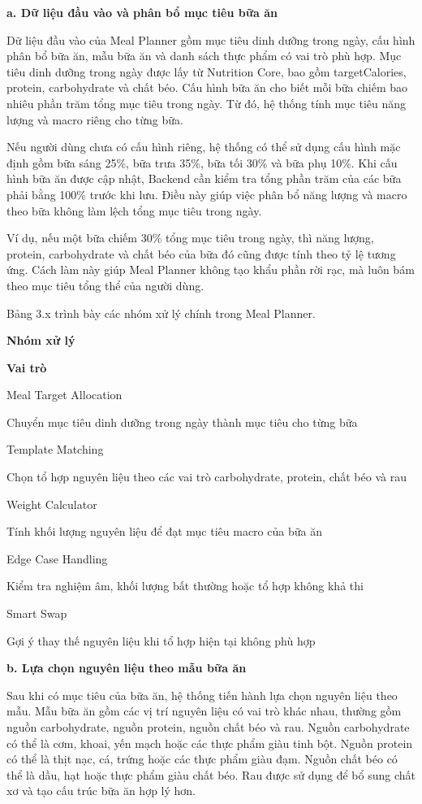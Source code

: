 \textbf{a. Dữ liệu đầu vào và phân bổ mục tiêu bữa ăn}

Dữ liệu đầu vào của Meal Planner gồm mục tiêu dinh dưỡng trong ngày, cấu hình phân bổ bữa ăn, mẫu bữa ăn và danh sách thực phẩm có vai trò phù hợp. Mục tiêu dinh dưỡng trong ngày được lấy từ Nutrition Core, bao gồm targetCalories, protein, carbohydrate và chất béo. Cấu hình bữa ăn cho biết mỗi bữa chiếm bao nhiêu phần trăm tổng mục tiêu trong ngày. Từ đó, hệ thống tính mục tiêu năng lượng và macro riêng cho từng bữa.

Nếu người dùng chưa có cấu hình riêng, hệ thống có thể sử dụng cấu hình mặc định gồm bữa sáng 25\%, bữa trưa 35\%, bữa tối 30\% và bữa phụ 10\%. Khi cấu hình bữa ăn được cập nhật, Backend cần kiểm tra tổng phần trăm của các bữa phải bằng 100\% trước khi lưu. Điều này giúp việc phân bổ năng lượng và macro theo bữa không làm lệch tổng mục tiêu trong ngày.

Ví dụ, nếu một bữa chiếm 30\% tổng mục tiêu trong ngày, thì năng lượng, protein, carbohydrate và chất béo của bữa đó cũng được tính theo tỷ lệ tương ứng. Cách làm này giúp Meal Planner không tạo khẩu phần rời rạc, mà luôn bám theo mục tiêu tổng thể của người dùng.

Bảng 3.x trình bày các nhóm xử lý chính trong Meal Planner.

\textbf{Nhóm xử lý}

\textbf{Vai trò}

Meal Target Allocation

Chuyển mục tiêu dinh dưỡng trong ngày thành mục tiêu cho từng bữa

Template Matching

Chọn tổ hợp nguyên liệu theo các vai trò carbohydrate, protein, chất béo và rau

Weight Calculator

Tính khối lượng nguyên liệu để đạt mục tiêu macro của bữa ăn

Edge Case Handling

Kiểm tra nghiệm âm, khối lượng bất thường hoặc tổ hợp không khả thi

Smart Swap

Gợi ý thay thế nguyên liệu khi tổ hợp hiện tại không phù hợp

\textbf{b. Lựa chọn nguyên liệu theo mẫu bữa ăn}

Sau khi có mục tiêu của bữa ăn, hệ thống tiến hành lựa chọn nguyên liệu theo mẫu. Mẫu bữa ăn gồm các vị trí nguyên liệu có vai trò khác nhau, thường gồm nguồn carbohydrate, nguồn protein, nguồn chất béo và rau. Nguồn carbohydrate có thể là cơm, khoai, yến mạch hoặc các thực phẩm giàu tinh bột. Nguồn protein có thể là thịt nạc, cá, trứng hoặc các thực phẩm giàu đạm. Nguồn chất béo có thể là dầu, hạt hoặc thực phẩm giàu chất béo. Rau được sử dụng để bổ sung chất xơ và tạo cấu trúc bữa ăn hợp lý hơn.

